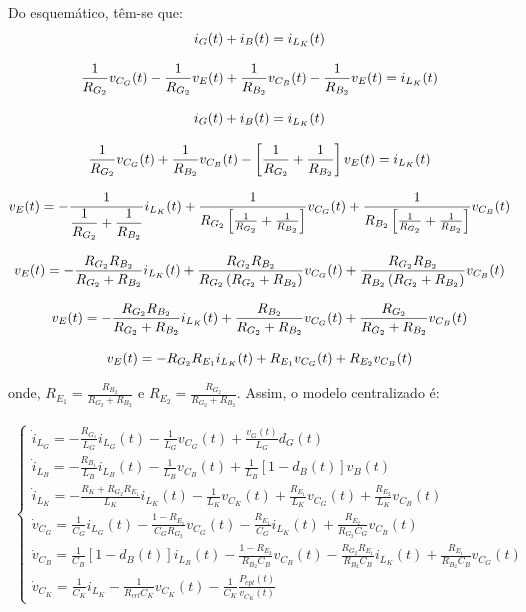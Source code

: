 \documentclass{article}
\newcommand{\ds}{\displaystyle}
\newcommand{\nle}{%
  \notag \\[8pt]
}
\begin{document}
Do esquemático, têm-se que:
\begin{gather}
  i_G(t) + i_B(t) = i_{L_K}(t) \nle
  \frac{1}{R_{G_2}} v_{C_G}(t) - \frac{1}{R_{G_2}} v_E(t) +
  \frac{1}{R_{B_2}} v_{C_B}(t) - \frac{1}{R_{B_2}} v_E(t) =  i_{L_K}(t) \nle
  i_G(t) + i_B(t) = i_{L_K}(t) \nle
  \frac{1}{R_{G_2}} v_{C_G}(t) + \frac{1}{R_{B_2}} v_{C_B}(t)
  - \left[\frac{1}{R_{G_2}} + \frac{1}{R_{B_2}}\right] v_E(t) =  i_{L_K}(t) \nle
  v_E(t) = - \frac{1}{\displaystyle \frac{1}{R_{G_2}} + \frac{1}{R_{B_2}}} i_{L_K}(t) + \frac{1}{R_{G_2} \left[\frac{1}{R_{G_2}} + \frac{1}{R_{B_2}}\right]} v_{C_G}(t) + \frac{1}{R_{B_2} \left[\frac{1}{R_{G_2}} + \frac{1}{R_{B_2}}\right]} v_{C_B}(t) \nle
  v_E(t) = - \frac{R_{G_2}R_{B_2}}{R_{G_2} + R_{B_2}} i_{L_K}(t) + \frac{R_{G_2}R_{B_2}}{R_{G_2} \left(R_{G_2} + R_{B_2}\right)} v_{C_G}(t) + \frac{R_{G_2}R_{B_2}}{R_{B_2} \left(R_{G_2} + R_{B_2}\right)}  v_{C_B}(t) \nle
  v_E(t) = - \frac{R_{G_2}R_{B_2}}{R_{G_2} + R_{B_2}} i_{L_K}(t) + \frac{R_{B_2}}{R_{G_2} + R_{B_2}} v_{C_G}(t) + \frac{R_{G_2}}{R_{G_2} + R_{B_2}}  v_{C_B}(t) \nle
  v_E(t) = - R_{G_2} R_{E_1} i_{L_K}(t) + R_{E_1} v_{C_G}(t) + R_{E_2} v_{C_B}(t)
\end{gather}

onde, $R_{E_1} = \displaystyle \frac{R_{B_2}}{R_{G_2} + R_{B_2}}$ e $R_{E_2} = \displaystyle \frac{R_{G_2}}{R_{G_2} + R_{B_2}}.$
\vspace*{2pt}
Assim, o modelo centralizado é:

\begin{gather}
  \begin{cases}
    \dot{i}_{L_G} = \ds - \frac{R_{G_1}}{L_G} i_{L_G}(t) - \frac{1}{L_G} v_{C_G}(t) + \frac{v_G(t)}{L_G} d_G(t)                                                                                                \\[12pt]
    \dot{i}_{L_B} = \ds - \frac{R_{B_1}}{L_B} i_{L_B}(t) - \frac{1}{L_B} v_{C_B} (t) + \frac{1}{L_B} \left[1 - d_B(t)\right] v_B(t)                                                                            \\[12pt]
    \dot{i}_{L_K} = \ds - \frac{R_K + R_{G_2} R_{E_1}}{L_K} i_{L_K}(t) - \frac{1}{L_K} v_{C_K}(t)  + \frac{R_{E_1}}{L_K} v_{C_G}(t) + \frac{R_{E_2}}{L_K} v_{C_B}(t)                                           \\[12pt]
    \dot{v}_{C_G} = \ds \frac{1}{C_G} i_{L_G}(t) - \frac{1 - R_{E_1}}{C_G R_{G_2}} v_{C_G}(t) - \frac{R_{E_1}}{C_G} i_{L_K}(t) + \frac{R_{E_2}}{R_{G_2} C_G} v_{C_B}(t)                                        \\[12pt]
    \dot{v}_{C_B} = \ds \frac{1}{C_B} \left[1 - d_B(t)\right] i_{L_B}(t) - \frac{1 - R_{E_2}}{R_{B_2}C_B} v_{C_B}(t) - \frac{R_{G_2} R_{E_1}}{R_{B_2} C_B} i_{L_K}(t) + \frac{R_{E_1}}{R_{B_2} C_B} v_{C_G}(t) \\[12pt]
    \dot{v}_{C_K} = \ds \frac{1}{C_K} i_{L_K} - \frac{1}{R_{crl} C_K} v_{C_K}(t) - \frac{1}{C_K} \frac{P_{cpl}(t)}{v_{C_K}(t)}
  \end{cases}
\end{gather}
\end{document}
